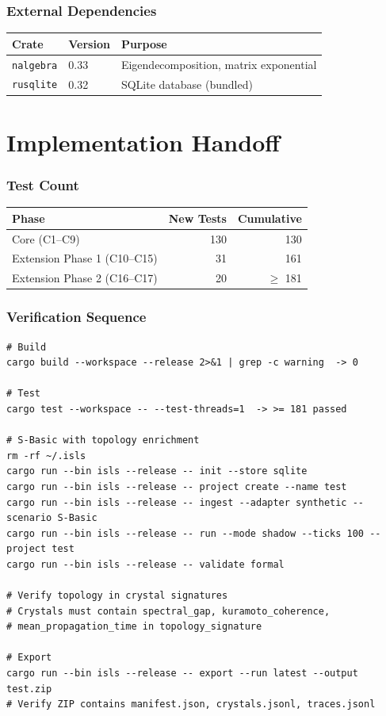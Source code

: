 \documentclass[11pt,a4paper,twoside]{article}
\theoremstyle{definition}
\theoremstyle{plain}
\theoremstyle{remark}
\begin{document}
\section{External Dependencies}

\begin{tabular}{l l l}
\toprule
\textbf{Crate} & \textbf{Version} & \textbf{Purpose} \\
\midrule
\texttt{nalgebra} & 0.33 & Eigendecomposition, matrix exponential \\
\texttt{rusqlite} & 0.32 & SQLite database (bundled) \\
\bottomrule
\end{tabular}


\part{Implementation Handoff}

\section{Test Count}

\begin{tabular}{l r r}
\toprule
\textbf{Phase} & \textbf{New Tests} & \textbf{Cumulative} \\
\midrule
Core (C1--C9) & 130 & 130 \\
Extension Phase 1 (C10--C15) & 31 & 161 \\
Extension Phase 2 (C16--C17) & 20 & $\ge$ 181 \\
\bottomrule
\end{tabular}

\section{Verification Sequence}

\begin{verbatim}
# Build
cargo build --workspace --release 2>&1 | grep -c warning  -> 0

# Test
cargo test --workspace -- --test-threads=1  -> >= 181 passed

# S-Basic with topology enrichment
rm -rf ~/.isls
cargo run --bin isls --release -- init --store sqlite
cargo run --bin isls --release -- project create --name test
cargo run --bin isls --release -- ingest --adapter synthetic --scenario S-Basic
cargo run --bin isls --release -- run --mode shadow --ticks 100 --project test
cargo run --bin isls --release -- validate formal

# Verify topology in crystal signatures
# Crystals must contain spectral_gap, kuramoto_coherence,
# mean_propagation_time in topology_signature

# Export
cargo run --bin isls --release -- export --run latest --output test.zip
# Verify ZIP contains manifest.json, crystals.jsonl, traces.jsonl
\end{verbatim}
\end{document}
